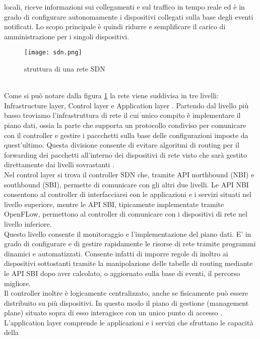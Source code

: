 locali, riceve informazioni sui collegamenti e sul traffico in tempo reale ed è in grado di
configurare autonomamente i dispositivi collegati sulla base degli eventi notificati. Lo scopo
principale è quindi ridurre e semplificare il carico di amministrazione per i singoli dispositivi.
\begin{figure}[h]
    \centering
   \texttt{[image: sdn.png]}
    \caption{struttura di una rete SDN \cite{fotosdn}}
    \label{fig:sdnF}
\end{figure}
\\Come si può notare dalla figura \ref{fig:sdnF} la rete viene suddivisa in tre livelli: Infrastructure layer, Control layer e Application layer \cite{sdnlayers}.
Partendo dal livello più basso troviamo l'infrastruttura di rete il cui unico compito è implementare il piano dati, ossia la parte che supporta un protocollo condiviso per comunicare con il controller e gestire
i paccchetti sulla base delle configurazioni imposte da quest'ultimo. 
Questa divisione consente di evitare algoritmi
di routing per il forwarding dei pacchetti all'interno dei dispositivi di rete visto che sarà
gestito direttamente dai livelli sovrastanti \cite{tesiSDN:2017}. 
\\Nel control layer si trova il controller SDN che, tramite API northbound (NBI) e southbound (SBI), permette di comunicare con
gli altri due livelli. Le API NBI consentono al controller di interfacciarsi con le applicazioni e i servizi situati nel livello superiore,
mentre le API SBI, tipicamente implementate tramite OpenFLow, permettono al controller di comunicare con i dispositivi di rete nel livello inferiore.
\\Questo livello consente il monitoraggio e l'implementazione del piano
dati. E' in grado di configurare e di gestire rapidamente le risorse di rete tramite programmi dinamici e automatizzati. Consente infatti di imporre regole di
inoltro ai dispositivi sottostanti tramite la manipolazione delle tabelle di routing mediante le API SBI dopo aver calcolato, o aggiornato sulla base di eventi, il percorso migliore.
\\Il controller inoltre è logicamente centralizzato, anche se fisicamente può essere distribuito su più dispositivi. In questo modo il piano di gestione (management plane) situato sopra di esso interagisce con un
unico punto di accesso \cite{tesiSDN:2020}.
\\L'application layer comprende le applicazioni e i servizi che sfruttano le capacità della
